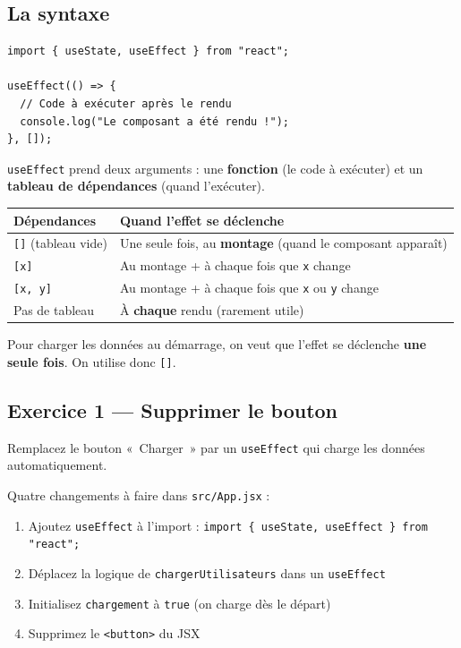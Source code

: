 \documentclass[11pt,a4paper]{article}
\begin{document}
\subsection{La syntaxe}

\begin{lstlisting}
import { useState, useEffect } from "react";

useEffect(() => {
  // Code à exécuter après le rendu
  console.log("Le composant a été rendu !");
}, []);
\end{lstlisting}

\texttt{useEffect} prend deux arguments : une \textbf{fonction} (le code à exécuter) et un \textbf{tableau de dépendances} (quand l'exécuter).

\begin{center}
\begin{tabular}{lp{8cm}}
\toprule
\textbf{Dépendances} & \textbf{Quand l'effet se déclenche} \\
\midrule
\texttt{[]} (tableau vide) & Une seule fois, au \textbf{montage} (quand le composant apparaît) \\
\texttt{[x]} & Au montage + à chaque fois que \texttt{x} change \\
\texttt{[x, y]} & Au montage + à chaque fois que \texttt{x} ou \texttt{y} change \\
Pas de tableau & À \textbf{chaque} rendu (rarement utile) \\
\bottomrule
\end{tabular}
\end{center}

Pour charger les données au démarrage, on veut que l'effet se déclenche \textbf{une seule fois}. On utilise donc \texttt{[]}.

\subsection{Exercice 1 --- Supprimer le bouton}

\begin{objectifbox}
Remplacez le bouton «~Charger~» par un \texttt{useEffect} qui charge les données automatiquement.
\end{objectifbox}

Quatre changements à faire dans \texttt{src/App.jsx} :

\begin{enumerate}[nosep]
\item Ajoutez \texttt{useEffect} à l'import : \texttt{import \{ useState, useEffect \} from "react";}
\item Déplacez la logique de \texttt{chargerUtilisateurs} dans un \texttt{useEffect}
\item Initialisez \texttt{chargement} à \texttt{true} (on charge dès le départ)
\item Supprimez le \texttt{<button>} du JSX
\end{enumerate}
\end{document}
